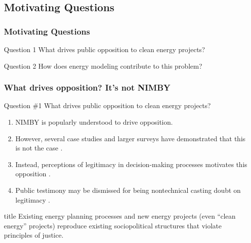 \subsection{Motivating Questions}
\begin{frame}
    \frametitle{Motivating Questions}

        \begin{block}{Question 1}
            What drives public opposition to clean energy projects?
        \end{block}
        \begin{block}{Question 2}
            How does energy modeling contribute to this problem? 
        \end{block}
\end{frame}


\begin{frame}
    \frametitle{What drives opposition? It's not NIMBY}

        \begin{block}{Question \#1}
            What drives public opposition to clean energy projects?
        \end{block}
        \begin{enumerate}
            \item NIMBY is popularly understood to drive opposition.
            \item However, several case studies and larger surveys have demonstrated
            that this is not the case \cite{konisky_proximity_2021,aitken_why_2010}.
            \item Instead, perceptions of legitimacy in decision-making processes
            motivates this opposition
            \cite{firestone_public_2012-1,stokes_prevalence_2023,
            aitken_why_2010,walker_procedural_2017,liu_effects_2020}.
            \item Public testimony may be dismissed for being nontechnical casting
            doubt on legitimacy \cite{johnson_dakota_2021}.
        \end{enumerate}
        \begin{block}{title}
            Existing energy planning processes and new energy projects (even ``clean energy'' projects) 
            reproduce existing sociopolitical structures that violate principles of justice.
        \end{block}
\end{frame}

